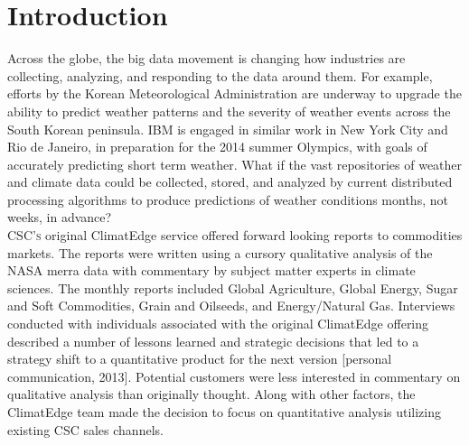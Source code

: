 \section{Introduction}
Across the globe, the big data movement is changing how industries are collecting, analyzing, and responding to the data around them. For example, efforts by the Korean Meteorological Administration are underway to upgrade the ability to predict weather patterns and the severity of weather events across the South Korean peninsula. IBM is engaged in similar work in New York City and Rio de Janeiro, in preparation for the 2014 summer Olympics, with goals of accurately predicting short term weather\cite{rwe}. What if the vast repositories of weather and climate data could be collected, stored, and analyzed by current distributed processing algorithms to produce predictions of weather conditions months, not weeks, in advance?\\

\textsc{CSC's} original ClimatEdge\texttrademark{} service offered forward looking reports to commodities markets. The reports were written using  a cursory qualitative analysis of the NASA \gls{merra} data with commentary by subject matter experts in climate sciences. The monthly reports included Global Agriculture, Global Energy, Sugar and Soft Commodities, Grain and Oilseeds, and Energy/Natural Gas\cite{climatedgeurl}. Interviews conducted with  individuals associated with the original ClimatEdge\texttrademark{} offering described a number of lessons learned and strategic decisions that led to a strategy shift to a quantitative product for the next version [personal communication, 2013]. Potential customers were less interested in commentary on qualitative analysis than originally thought. Along with other factors, the ClimatEdge\texttrademark{} team made the decision to focus on quantitative analysis utilizing existing CSC sales channels. \\

